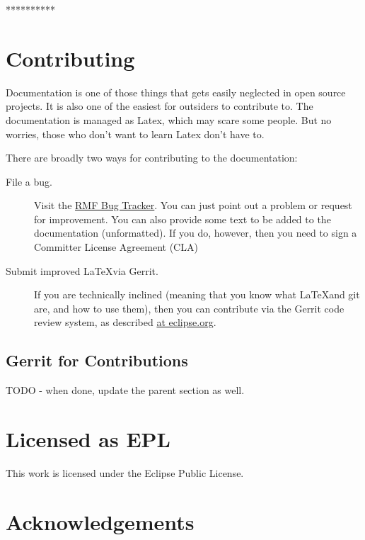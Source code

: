 **********


\section{Contributing}

Documentation is one of those things that gets easily neglected in open source projects.  It is also one of the easiest for outsiders to contribute to.  The documentation is managed as Latex, which may scare some people.  But no worries, those who don't want to learn Latex don't have to.

There are broadly two ways for contributing to the documentation:

\begin{description}
  \item[File a bug.]  Visit the \href{https://bugs.eclipse.org/bugs/enter_bug.cgi?assigned_to=&blocked=&bug_severity=normal&bug_status=NEW&comment=&contenttypeentry=&contenttypemethod=autodetect&data=&dependson=&description=&flag_type-1=X&flag_type-11=X&flag_type-12=X&flag_type-2=X&flag_type-4=X&flag_type-6=X&flag_type-7=X&flag_type-8=X&form_name=enter_bug&keywords=&&op_sys=All&product=MDT.RMF&qa_contact=&rep_platform=All&short_desc=&version=unspecified}{RMF Bug Tracker}.  You can just point out a problem or request for improvement.  You can also provide some text to be added to the documentation (unformatted).  If you do, however, then you need to sign a Committer License Agreement (CLA)
  \item[Submit improved \LaTeX via Gerrit.]  If you are technically inclined (meaning that you know what \LaTeX and git are, and how to use them), then you can contribute via the Gerrit code review system, as described \href{https://wiki.eclipse.org/Gerrit}{at eclipse.org}.
\end{description}

\subsection{Gerrit for Contributions}

TODO - when done, update the parent section as well.

\section{Licensed as EPL}

This work is licensed under the Eclipse Public License.

\section{Acknowledgements}

